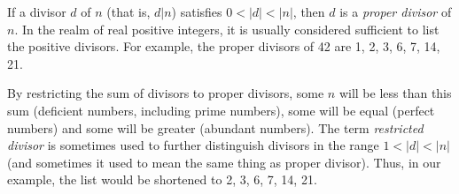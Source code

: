 \documentclass[12pt]{article}
\begin{document}
If a divisor $d$ of $n$ (that is, $d|n$) satisfies $0 < |d| < |n|$, then $d$ is a {\em proper divisor} of $n$. In the realm of real positive integers, it is usually considered sufficient to list the positive divisors. For example, the proper divisors of 42 are 1, 2, 3, 6, 7, 14, 21.

By restricting the sum of divisors to proper divisors, some $n$ will be less than this sum (deficient numbers, including prime numbers), some will be equal (perfect numbers) and some will be greater (abundant numbers). The term {\em restricted divisor} is sometimes used to further distinguish divisors in the range $1 < |d| < |n|$ (and sometimes it used to mean the same thing as proper divisor). Thus, in our example, the list would be shortened to 2, 3, 6, 7, 14, 21.
\end{document}
